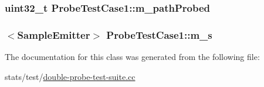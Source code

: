 \subsubsection[{\texorpdfstring{m\+\_\+path\+Probed}{m_pathProbed}}]{\setlength{\rightskip}{0pt plus 5cm}uint32\+\_\+t Probe\+Test\+Case1\+::m\+\_\+path\+Probed\hspace{0.3cm}{\ttfamily [private]}}\hypertarget{classProbeTestCase1_a40dc8f26332f36646863aeceb9f101ee}{}\label{classProbeTestCase1_a40dc8f26332f36646863aeceb9f101ee}
\subsubsection[{\texorpdfstring{m\+\_\+s}{m_s}}]{$<${\bf Sample\+Emitter}$>$ Probe\+Test\+Case1\+::m\+\_\+s\hspace{0.3cm}{\ttfamily [private]}}\hypertarget{classProbeTestCase1_a982ddaa77f28cc097601f056e2174ec3}{}\label{classProbeTestCase1_a982ddaa77f28cc097601f056e2174ec3}


The documentation for this class was generated from the following file\+:\begin{DoxyCompactItemize}
\item 
stats/test/\hyperlink{double-probe-test-suite_8cc}{double-\/probe-\/test-\/suite.\+cc}\end{DoxyCompactItemize}
